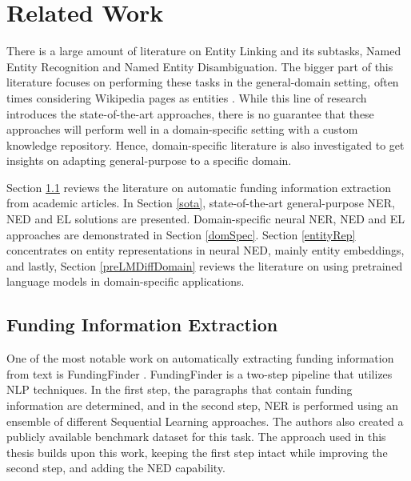 \documentclass{article}
\theoremstyle{definition}
\theoremstyle{remark}
\begin{document}
\newpage
\section{Related Work}
There is a large amount of literature on Entity Linking and its subtasks, Named Entity Recognition and Named Entity Disambiguation. The bigger part of this literature focuses on performing these tasks in the general-domain setting, often times considering Wikipedia pages as entities \cite{nlpnotes}. While this line of research introduces the state-of-the-art approaches, there is no guarantee that these approaches will perform well in a domain-specific setting with a custom knowledge repository. Hence, domain-specific literature is also investigated to get insights on adapting general-purpose to a specific domain.

Section \ref{FundingDataExtraction} reviews the literature on automatic funding information extraction from academic articles. In Section \ref{sota}, state-of-the-art general-purpose NER, NED and EL solutions are presented. Domain-specific neural NER, NED and EL approaches are demonstrated in Section \ref{domSpec}. Section \ref{entityRep} concentrates on entity representations in neural NED, mainly entity embeddings, and lastly, Section \ref{preLMDiffDomain} reviews the literature on using pretrained language models in domain-specific applications.
\subsection{Funding Information Extraction}
\label{FundingDataExtraction}

    One of the most notable work on automatically extracting funding information from text is FundingFinder \cite{ElsPaper}. FundingFinder is a two-step pipeline that utilizes NLP techniques. In the first step, the paragraphs that contain funding information are determined, and in the second step, NER is performed using an ensemble of different Sequential Learning approaches. The authors also created a publicly available benchmark dataset for this task. The approach used in this thesis builds upon this work, keeping the first step intact while improving the second step, and adding the NED capability. 
    
\end{document}

